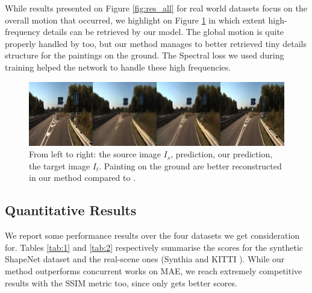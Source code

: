 While results presented on Figure \ref{fig:res_all} for real world datasets focus on the overall motion that occurred, we highlight on Figure \ref{fig:res_all2} in which extent high-frequency details can be retrieved by our model. The global motion is quite properly handled by \citep{kim2020novel} too, but our method manages to better retrieved tiny details structure for the paintings on the ground. The Spectral loss we used during training helped the network to handle these high frequencies. 
\begin{figure}[h!]
    \begin{center}
    \includegraphics[width=.8\textwidth]{images/epipolarnvs/rebbutal_KITTI_3.jpg}
    \end{center}
     \caption{From left to right: the source image  $I_s$, \citep{kim2020novel} prediction, our prediction, the target image $I_t$. Painting on the ground are better reconstructed in our method compared to \citep{kim2020novel}.}
     \label{fig:res_all2}
\end{figure}

  
\subsection{Quantitative Results }

We report some performance results over the four datasets we get consideration for. Tables \ref{tab:1} and \ref{tab:2} respectively summarise the scores for the synthetic ShapeNet \citep{chang2015shapenet} dataset and the real-scene ones (Synthia \citep{ros2016synthia} and KITTI \citep{geiger2012we}). While our method outperforms concurrent works on MAE, we reach extremely competitive results with the SSIM metric too, since only \citep{sun2018multiview} gets better scores. \newline

